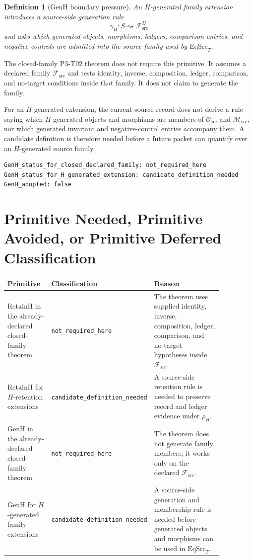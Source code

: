 \documentclass[11pt]{article}
\newcommand{\EqSrcT}{\mathrm{EqSrc}_{T}}
\newcommand{\RetainH}{\mathrm{RetainH}}
\newcommand{\GenH}{\mathrm{GenH}}
\newcommand{\Fsrc}{\mathcal{F}_{\mathrm{src}}}
\newcommand{\Osrc}{\mathcal{O}_{\mathrm{src}}}
\newcommand{\Msrc}{\mathcal{M}_{\mathrm{src}}}
\newcommand{\Hret}{\rho_{H}}
\newcommand{\Hgen}{\gamma_{H}}
\newtheorem{definition}{Definition}
\begin{document}
\begin{definition}[GenH boundary pressure]
An \(H\)-generated family extension introduces a source-side generation rule
\[
  \Hgen:S\rightsquigarrow \Fsrc^{H}
\]
and asks which generated objects, morphisms, ledgers, comparison entries, and
negative controls are admitted into the source family used by \(\EqSrcT\).
\end{definition}

The closed-family P3-T02 theorem does not require this primitive. It assumes a
declared family \(\Fsrc\) and tests identity, inverse, composition, ledger,
comparison, and no-target conditions inside that family. It does not claim to
generate the family.

For an \(H\)-generated extension, the current source record does not derive a
rule saying which \(H\)-generated objects and morphisms are members of
\(\Osrc\) and \(\Msrc\), nor which generated invariant and negative-control
entries accompany them. A candidate definition is therefore needed before a
future packet can quantify over an \(H\)-generated source family.

\begin{verbatim}
GenH_status_for_closed_declared_family: not_required_here
GenH_status_for_H_generated_extension: candidate_definition_needed
GenH_adopted: false
\end{verbatim}

\section{Primitive Needed, Primitive Avoided, or Primitive Deferred Classification}

\begin{longtable}{p{0.21\linewidth}p{0.30\linewidth}p{0.35\linewidth}}
\toprule
Primitive & Classification & Reason \\
\midrule
\(\RetainH\) in the already-declared closed-family theorem & \texttt{not\_required\_here} & The theorem uses supplied identity, inverse, composition, ledger, comparison, and no-target hypotheses inside \(\Fsrc\). \\
\(\RetainH\) for \(H\)-retention extensions & \texttt{candidate\_definition\_needed} & A source-side retention rule is needed to preserve record and ledger evidence under \(\Hret\). \\
\(\GenH\) in the already-declared closed-family theorem & \texttt{not\_required\_here} & The theorem does not generate family members; it works only on the declared \(\Fsrc\). \\
\(\GenH\) for \(H\)-generated family extensions & \texttt{candidate\_definition\_needed} & A source-side generation and membership rule is needed before generated objects and morphisms can be used in \(\EqSrcT\). \\
\bottomrule
\end{longtable}
\end{document}
